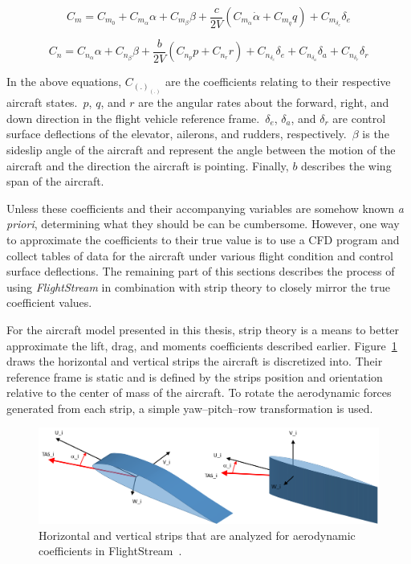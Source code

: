 \begin{equation}\label{eq:pitchingmomentcoefficient}
    C_m = C_{m_0} + C_{m_\alpha}\alpha + C_{m_\beta}\beta + \frac{c}{2V}\left(C_{m_{\dot{\alpha}}}\dot{\alpha} + C_{m_q}q\right) + C_{m_{\delta_e}}\delta_e
\end{equation}

\begin{equation}\label{eq:yawingmomentcoefficient}
    C_n = C_{n_\alpha}\alpha + C_{n_\beta}\beta + \frac{b}{2V}\left(C_{n_{p}}p + C_{n_r}r\right) + C_{n_{\delta_e}}\delta_e + C_{n_{\delta_a}}\delta_a + C_{n_{\delta_r}}\delta_r
\end{equation}

In the above equations, \(C_{{(.)}_{(.)}}\) are the coefficients relating to their respective aircraft states.~\(p\), \(q\), and \(r\) are the angular rates about the forward, right, and down direction in the flight vehicle reference frame.~\(\delta_e\), \(\delta_a\), and \(\delta_r\) are control surface deflections of the elevator, ailerons, and rudders, respectively.~\( \beta \) is the sideslip angle of the aircraft and represent the angle between the motion of the aircraft and the direction the aircraft is pointing. Finally, \(b\) describes the wing span of the aircraft.

Unless these coefficients and their accompanying variables are somehow known \textit{a priori}, determining what they should be can be cumbersome. However, one way to approximate the coefficients to their true value is to use a CFD program and collect tables of data for the aircraft under various flight condition and control surface deflections. The remaining part of this sections describes the process of using \textit{FlightStream} in combination with strip theory to closely mirror the true coefficient values.

For the aircraft model presented in this thesis, strip theory is a means to better approximate the lift, drag, and moments coefficients described earlier. Figure~\ref{fig:strips} draws the horizontal and vertical strips the aircraft is discretized into. Their reference frame is static and is defined by the strips position and orientation relative to the center of mass of the aircraft. To rotate the aerodynamic forces generated from each strip, a simple yaw{--}pitch{--}row transformation is used.

\begin{figure}[!ht]\label{fig:strips}
    \centering
    \includegraphics[width=0.75\linewidth]{Figures/horvertstrips.png}
    \caption{Horizontal and vertical strips that are analyzed for aerodynamic coefficients in FlightStream~\cite{AerodynamicStripTheory2021}.}
\end{figure}

